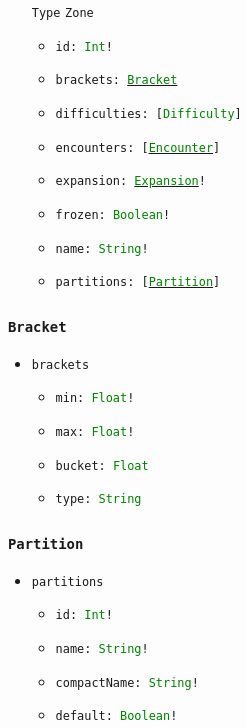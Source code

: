 \documentclass[10pt, a4paper]{memoir}
\numberwithin{equation}{section}
\theoremstyle{plain}
\theoremstyle{defp}
\theoremstyle{dotless}
\theoremstyle{definition}
\theoremstyle{dotless}
\theoremstyle{dotless}
\theoremstyle{defp}
\theoremstyle{defp}
\theoremstyle{be}          %
\theoremstyle{defp}
\newcommand\ttt[1]{\texttt{#1}}
\newcommand\type[1]{\ttt{\textcolor{green}{#1}}}
\begin{document}
\begin{itemize}[noitemsep,topsep=1pt]
\item[\ttt{Type}] \ttt{Zone}
\begin{itemize}[itemsep=1pt,topsep=1pt]
\item \ttt{id: \type{Int}!}
\item \ttt{brackets: \hyperref[sec:Bracket]{\type{Bracket}}}
\item \ttt{difficulties: [\type{Difficulty}]}
\item \ttt{encounters: [\hyperref[sec:Encounter]{\type{Encounter}}]}
\item \ttt{expansion: \hyperref[sec:Expansion]{\type{Expansion}}!}
\item \ttt{frozen: \type{Boolean}!}
\item \ttt{name: \type{String}!}
\item \ttt{partitions: [\hyperref[sec:Partition]{\type{Partition}}]}
\end{itemize}
\end{itemize}

\subsubsection{\ttt{Bracket}}\label{sec:Bracket}
\begin{itemize}[noitemsep,topsep=1pt]
\item \ttt{brackets}
\begin{itemize}[itemsep=1pt,topsep=1pt]
\item \ttt{min: \type{Float}!}
\item \ttt{max: \type{Float}!}
\item \ttt{bucket: \type{Float}}
\item \ttt{type: \type{String}}
\end{itemize}
\end{itemize}

\subsubsection{\ttt{Partition}}\label{sec:Partition}
\begin{itemize}[noitemsep,topsep=1pt]
\item \ttt{partitions}
\begin{itemize}[itemsep=1pt,topsep=1pt]
\item \ttt{id: \type{Int}!}
\item \ttt{name: \type{String}!}
\item \ttt{compactName: \type{String}!}
\item \ttt{default: \type{Boolean}!}
\end{itemize}
\end{itemize}
\end{document}

